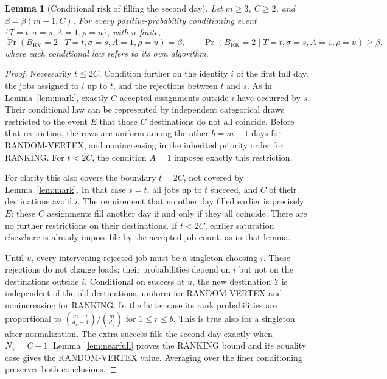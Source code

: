 \documentclass[11pt]{article}
\newtheorem{lemma}{Lemma}
\newcommand{\RV}{\mathrm{RV}}
\newcommand{\RK}{\mathrm{RK}}
\begin{document}
\begin{lemma}[Conditional risk of filling the second day]\label{lem:fillsecond}
Let $m\geq3$, $C\geq2$, and $\beta=\beta(m-1,C)$.
For every positive-probability conditioning event
$\{T=t,\sigma=s,A=1,\rho=u\}$, with $u$ finite,
\[
 \Pr(B_\RV=2\mid T=t,\sigma=s,A=1,\rho=u)=\beta,
 \qquad
 \Pr(B_\RK=2\mid T=t,\sigma=s,A=1,\rho=u)\geq\beta,
\]
where each conditional law refers to its own algorithm.
\end{lemma}
\begin{proof}
Necessarily $t\leq2C$. Condition further on the identity $i$ of the
first full day, the jobs assigned to $i$ up to $t$, and the rejections
between $t$ and $s$. As in Lemma~\ref{lem:mark}, exactly $C$ accepted
assignments outside $i$ have occurred by $s$. Their conditional law can
be represented by independent categorical draws restricted to the event
$E$ that those $C$ destinations do not all coincide. Before that
restriction, the rows are uniform among the other $b=m-1$ days for
RANDOM-VERTEX, and nonincreasing in the inherited priority order for
RANKING. For $t<2C$, the condition $A=1$ imposes exactly this restriction.

For clarity this also covers the boundary $t=2C$, not covered by
Lemma~\ref{lem:mark}. In that case $s=t$, all jobs up to $t$ succeed,
and $C$ of their destinations avoid $i$. The requirement that no other
day filled earlier is precisely $E$: these $C$ assignments fill another
day if and only if they all coincide. There are no further restrictions
on their destinations. If $t<2C$, earlier saturation elsewhere is
already impossible by the accepted-job count, as in that lemma.

Until $u$, every intervening rejected job must be a singleton choosing
$i$. These rejections do not change loads; their probabilities depend
on $i$ but not on the destinations outside $i$. Conditional on success
at $u$, the new destination $Y$ is independent of the old destinations,
uniform for RANDOM-VERTEX and nonincreasing for RANKING. In the latter
case its rank probabilities are proportional to
$\binom{m-r}{d_u-1}/\binom m{d_u}$ for $1\leq r\leq b$.
This is true also for a singleton after normalization.
The extra success fills the second day exactly when $N_Y=C-1$.
Lemma~\ref{lem:nearfull} proves the RANKING bound and its equality
case gives the RANDOM-VERTEX value. Averaging over the finer
conditioning preserves both conclusions.
\end{proof}
\end{document}
